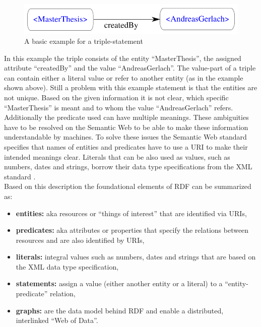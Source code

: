 \begin{figure}[H]
	\centering
		\includegraphics[width=0.8\columnwidth]{images/sample_triple.pdf}
	\caption{A basic example for a triple-statement}
\label{fig:images_semweb_triple}
\end{figure}

In this example the triple consists of the entity ``MasterThesis'', the assigned attribute ``createdBy'' and the value ``AndreasGerlach''. The value-part of a triple can contain either a literal value or refer to another entity (as in the example shown above). Still a problem with this example statement is that the entities are not unique. Based on the given information it is not clear, which specific ``MasterThesis'' is meant and to whom the value ``AndreasGerlach'' refers. Additionally the predicate used can have multiple meanings. These ambiguities have to be resolved on the Semantic Web to be able to make these information understandable by machines. To solve these issues the Semantic Web standard specifies that names of entities and predicates have to use a \gls{URI} to make their intended meanings clear. Literals that can be also used as values, such as numbers, dates and strings, borrow their data type specifications from the \gls{XML} standard \citep[pg. 15-38]{wood2014linked}. \\

Based on this description the foundational elements of \gls{RDF} can be summarized as: \@

\begin{itemize}
	\item \textbf{entities:} aka resources or ``things of interest'' that are identified via \gls{URI}s,
	\item \textbf{predicates:} aka attributes or properties that specify the relations between resources and are also identified by \gls{URI}s,
	\item \textbf{literals:} integral values such as numbers, dates and strings that are based on the \gls{XML} data type specification,
	\item \textbf{statements:} assign a value (either another entity or a literal) to a ``entity-predicate'' relation,
	\item \textbf{graphs:} are the data model behind \gls{RDF} and enable a  distributed, interlinked ``Web of Data''.
\end{itemize}

